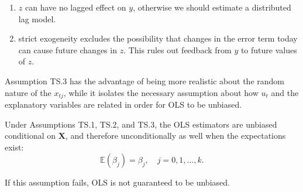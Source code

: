 \documentclass[a4paper, 10pt]{article}
\theoremstyle{definition}	%
\begin{document}
\begin{enumerate}
    \item \( z \) can have no lagged effect on \( y \), otherwise we should estimate a distributed lag model.
    \item strict exogeneity excludes the possibility that changes in the error term today can cause future changes in \( z \). This rules out feedback from \( y \) to future values of \( z \).
\end{enumerate}
Assumption TS.3 has the advantage of being more realistic about the random nature of the $x_{tj}$, while it isolates the necessary assumption about how $u_t$ and the explanatory variables are related in order for OLS to be unbiased.
\begin{tcolorbox}[colback=blue!5!white, colframe=blue!80!black, title=Theorem 1 -- Unbiasedness of OLS]
Under Assumptions TS.1, TS.2, and TS.3, the OLS estimators are unbiased conditional on \( \mathbf{X} \), and therefore unconditionally as well when the expectations exist:
\[
\mathbb{E}(\hat{\beta}_j) = \beta_j, \quad j = 0, 1, \dots, k.
\]
\end{tcolorbox}
If this assumption fails, OLS is not guaranteed to be unbiased.
\end{document}
